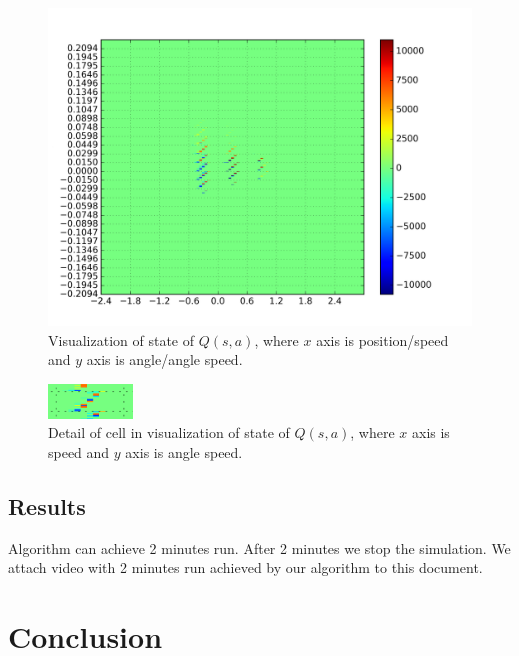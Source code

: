 \documentclass[12pt,a4paper]{article}
\begin{document}
\begin{figure}[!ht]
\centering
\includegraphics[width=1.0\textwidth]{visualization.png}
\caption{Visualization of state of $Q(s, a)$, where $x$ axis is position/speed and $y$ axis is angle/angle speed.}
\label{img:visualization}
\end{figure}

\begin{figure}[!ht]
\centering
\includegraphics[width=0.2\textwidth]{visualization-zoom.png}
\caption{Detail of cell in visualization of state of $Q(s, a)$, where $x$ axis is speed and $y$ axis is angle speed.}
\label{img:visualization}
\end{figure}

\subsection{Results}

Algorithm can achieve 2 minutes run. After 2 minutes we stop the simulation. We attach video with 2 minutes run achieved by our algorithm to this document.


\section{Conclusion}
\end{document}
